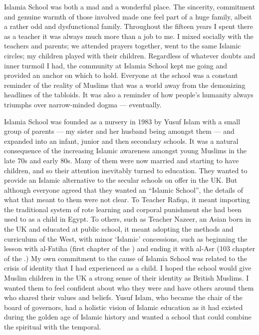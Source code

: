 \documentclass[12pt]{memoir}
\begin{document}
Islamia School was both a mad and a wonderful place.
The sincerity, commitment and genuine warmth of those involved
made one feel part of a huge family,
albeit a rather odd and dysfunctional family.
Throughout the fifteen years I spent there as a teacher
it was always much more than a job to me.
I mixed socially with the teachers and parents;
we attended prayers together, went to the same Islamic circles;
my children played with their children.
Regardless of whatever doubts and inner turmoil I had,
the community at Islamia School kept me going
and provided an anchor on which to hold.
Everyone at the school was a constant reminder of the reality of Muslims
that was a world away from the demonizing headlines of the tabloids.
It was also a reminder of how people’s humanity
always triumphs over narrow-minded dogma — eventually.

Islamia School was founded as a nursery in 1983
by Yusuf Islam with a small group of parents —
my sister and her husband being amongst them —
and expanded into an infant, junior and then secondary schools.
It was a natural consequence of the increasing Islamic awareness
amongst young Muslims in the late 70s and early 80s.
Many of them were now married and starting to have children,
and so their attention inevitably turned to education.
They wanted to provide an Islamic alternative
to the secular schools on offer in the UK.
But although everyone agreed that they wanted an “Islamic School”,
the details of what that meant to them were not clear.
To Teacher Rafiqa, it meant importing the traditional system of rote learning
and corporal punishment she had been used to as a child in Egypt.
To others, such as Teacher Nazeer, an Asian born in the UK
and educated at public school,
it meant adopting the methods and curriculum of the West,
with minor ‘Islamic’ concessions,
such as beginning the lesson with al-Fatiha (first chapter of the \Quran)
and ending it with al-Asr (103 chapter of the \Quran.)
My own commitment to the cause of Islamia School was related
to the crisis of identity that I had experienced as a child.
I hoped the school would give Muslim children in the UK
a strong sense of their identity as British Muslims.
I wanted them to feel confident about who they were
and have others around them who shared their values and beliefs.
Yusuf Islam, who became the chair of the board of governors,
had a holistic vision of Islamic education as it had existed
during the golden age of Islamic history and wanted a school
that could combine the spiritual with the temporal.
\end{document}
